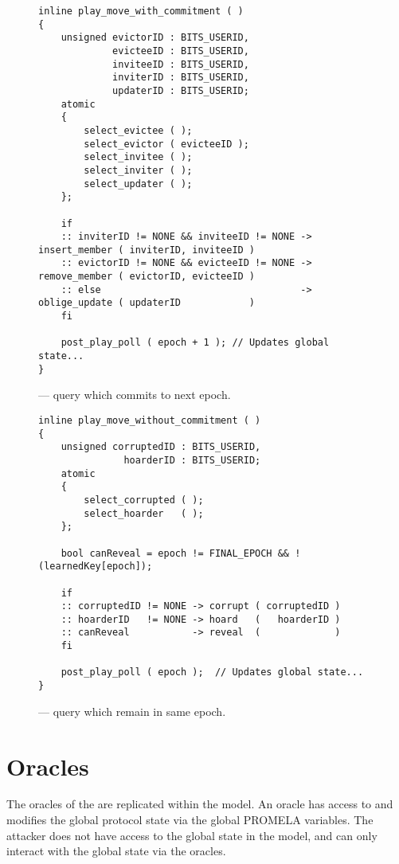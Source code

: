 \begin{figure}[h!]
  \centering
  \caption{\label{fig:Control-Commitment}\CGKAmod{}{}{} --- query which commits to next epoch.}
\begin{verbatim}
inline play_move_with_commitment ( )
{
    unsigned evictorID : BITS_USERID, 
             evicteeID : BITS_USERID, 
             inviteeID : BITS_USERID, 
             inviterID : BITS_USERID,
             updaterID : BITS_USERID;
    atomic
    {
        select_evictee ( );
        select_evictor ( evicteeID );
        select_invitee ( );
        select_inviter ( );
        select_updater ( );
    };

    if
    :: inviterID != NONE && inviteeID != NONE -> insert_member ( inviterID, inviteeID )
    :: evictorID != NONE && evicteeID != NONE -> remove_member ( evictorID, evicteeID )
    :: else                                   -> oblige_update ( updaterID            )
    fi

    post_play_poll ( epoch + 1 ); // Updates global state...
}
\end{verbatim}
\end{figure}

\begin{figure}[h!]
  \centering
  \caption{\label{fig:Control-Noncommitment}\CGKAmod{}{}{} --- query which remain in same epoch.}
\begin{verbatim}
inline play_move_without_commitment ( )
{
    unsigned corruptedID : BITS_USERID, 
               hoarderID : BITS_USERID;
    atomic
    {
        select_corrupted ( );
        select_hoarder   ( );
    };

    bool canReveal = epoch != FINAL_EPOCH && !(learnedKey[epoch]);

    if
    :: corruptedID != NONE -> corrupt ( corruptedID )
    :: hoarderID   != NONE -> hoard   (   hoarderID )
    :: canReveal           -> reveal  (             )
    fi

    post_play_poll ( epoch );  // Updates global state...
}
\end{verbatim}
\end{figure}


\hypertarget{sec:game-oracles}{%
\section{Oracles}\label{sec:game-oracles}}

The oracles of the \CGKAsec are replicated within the  model.
An oracle has access to and modifies the global protocol state via the global PROMELA variables.
The attacker does not have access to the global state in the \CGKAmod model, and can only interact with the global state via the oracles.

